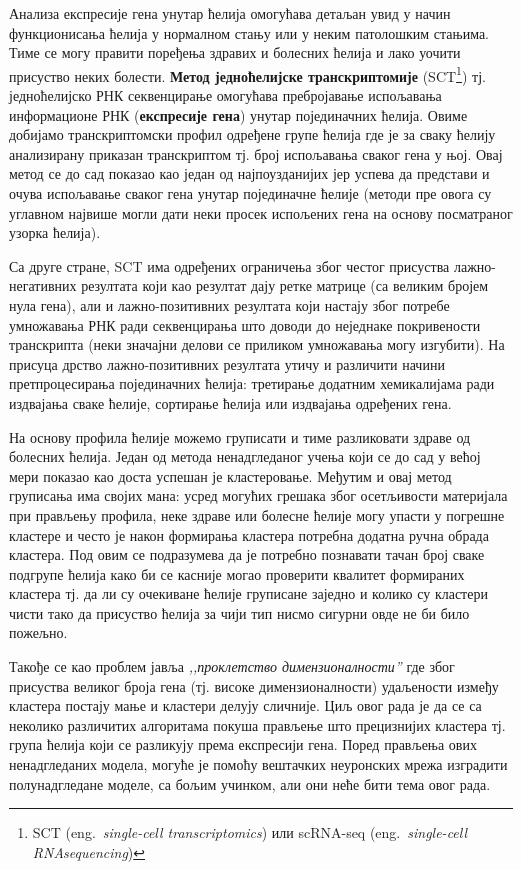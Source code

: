 \documentclass[10pt, a4paper]{article}
\begin{document}
Анализа експресије гена унутар ћелија омогућава детаљан увид у начин функционисања ћелија у нормалном стању или у неким патолошким стањима. \cite{celije}\cite{transkriptomija} Тиме се могу правити поређења здравих и болесних ћелија и лако уочити присуство неких болести. \textbf{Метод једноћелијске транскриптомије} (SCT\footnote{SCT (eng.~{\em single-cell transcriptomics}) или scRNA-seq (eng.~{\em single-cell RNAsequencing})}) тј. једноћелијско РНК секвенцирање омогућава пребројавање испољавања информационе РНК (\textbf{експресије гена}) унутар појединачних ћелија. Овиме добијамо транскриптомски профил одређене групе ћелија где је за сваку ћелију анализирану приказан транскриптом тј. број испољавања сваког гена у њој. Овај метод се до сад показао као један од најпоузданијих јер успева да представи и очува испољавање сваког гена унутар појединачне ћелије (методи пре овога су углавном највише могли дати неки просек испољених гена на основу посматраног узорка ћелија). 

Са друге стране, SCT има одређених ограничења због честог присуства лажно-негативних резултата који као резултат дају ретке матрице (са великим бројем нула гена), али и лажно-позитивних резултата који настају због потребе умножавања РНК ради секвенцирања што доводи до неједнаке покривености транскрипта (неки значајни делови се приликом умножавања могу изгубити). На присуца дрство лажно-позитивних резултата утичу и различити начини претпроцесирања појединачних ћелија: третирање додатним хемикалијама ради издвајања сваке ћелије, сортирање ћелија или издвајања одређених гена.

На основу профила ћелије можемо груписати и тиме разликовати здраве од болесних ћелија. Један од метода ненадгледаног учења који се до сад у већој мери показао као доста успешан је кластеровање. Међутим и овај метод груписања има својих мана: усред могућих грешака због осетљивости материјала при прављењу профила, неке здраве или болесне ћелије могу упасти у погрешне кластере и често је након формирања кластера потребна додатна ручна обрада кластера. Под овим се подразумева да је потребно познавати тачан број сваке подгрупе ћелија како би се касније могао проверити квалитет формираних кластера тј. да ли су очекиване ћелије груписане заједно и колико су кластери чисти тако да присуство ћелија за чији тип нисмо сигурни овде не би било пожељно.

Такође се као проблем јавља {\em,,проклетство димензионалности''} где због присуства великог броја гена (тј. високе димензионалности) удаљености између кластера постају мање и кластери делују сличније. Циљ овог рада је да се са неколико различитих алгоритама покуша прављење што прецизнијих кластера тј. група ћелија који се разликују према експресији гена. Поред прављења ових ненадгледаних модела, могуће је помоћу вештачких неуронских мрежа изградити полунадгледане моделе, са бољим учинком, али они неће бити тема овог рада.
\end{document}
